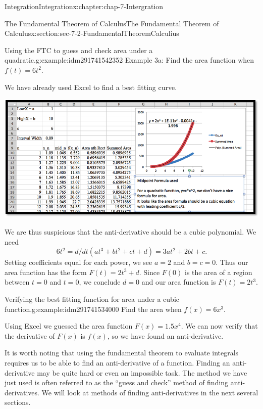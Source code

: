 \documentclass[oneside,10pt,]{book}
\numberwithin{equation}{section}
\begin{document}
\begin{chapterptx}{Integration}{}{Integration}{}{}{x:chapter:chap-7-Intergration}
\begin{sectionptx}{The Fundamental Theorem of Calculus}{}{The Fundamental Theorem of Calculus}{}{}{x:section:sec-7-2-FundamentalTheoremCalculius}
\begin{example}{Using the FTC to guess and check area under a quadratic.}{g:example:idm291741542352}%
Example 3a: Find the area function when \(f(t) = 6t^2\).%
\par
We have already used Excel to find a best fitting curve.%
\begin{sidebyside}{1}{0}{0}{0}%
\begin{sbspanel}{1}%
\includegraphics[width=\linewidth]{images/sec7-2-10.png}
\end{sbspanel}%
\end{sidebyside}%
\par
We are thus suspicious that the anti-derivative should be a cubic polynomial.  We need%
%
\begin{equation*}
6t^2=d/dt (at^3+bt^2+ct+d)=3at^2+2bt+c.
\end{equation*}
Setting coefficients equal for each power, we see \(a = 2\) and \(b = c = 0\).  Thus our area function has the form \(F(t) = 2 t^3 + d\).  Since \(F(0)\) is the area of a region between \(t = 0\) and \(t = 0\), we conclude \(d = 0\) and our area function is \(F(t) = 2 t^3\).%
\end{example}
\begin{example}{Verifying the best fitting function for area under a cubic function.}{g:example:idm291741534000}%
Find the area when \(f(x) = 6 x^3\).%
\par
Using Excel we guessed the area function \(F(x) = 1.5 x^4\).  We can now verify that the derivative of \(F(x)\) is \(f(x)\), so we have found an anti-derivative.%
\end{example}
It is worth noting that using the fundamental theorem to evaluate integrals requires us to be able to find an anti-derivative of a function.  Finding an anti-derivative may be quite hard or even an impossible task.  The method we have just used is often referred to as the “guess and check” method of finding anti-derivatives.  We will look at methods of finding anti-derivatives in the next several sections.%

\end{sectionptx}
\end{chapterptx}
\end{document}
